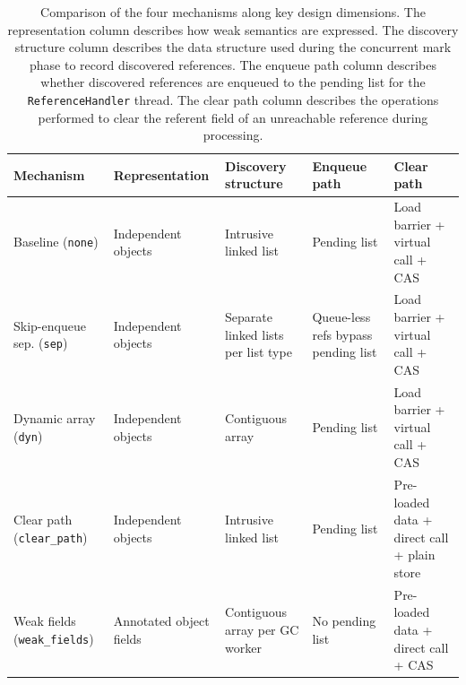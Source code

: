 \begin{table}[t]
\centering
\caption[Summary comparison of the four mechanisms]{Comparison of the four mechanisms along key design dimensions. The representation column describes how weak semantics are expressed. The discovery structure column describes the data structure used during the concurrent mark phase to record discovered references. The enqueue path column describes whether discovered references are enqueued to the pending list for the \texttt{ReferenceHandler} thread. The clear path column describes the operations performed to clear the referent field of an unreachable reference during processing.}
\label{tab:mechanism-summary}
\small
\begin{tabularx}{\textwidth}{@{}>{\hsize=1.0\hsize\raggedright\arraybackslash}X
                              >{\hsize=1.0\hsize\raggedright\arraybackslash}X
                              >{\hsize=1.0\hsize\raggedright\arraybackslash}X
                              >{\hsize=1.0\hsize\raggedright\arraybackslash}X
                              >{\hsize=1.0\hsize\raggedright\arraybackslash}X@{}}
\toprule
\textbf{Mechanism} & \textbf{Representation} & \textbf{Discovery structure} & \textbf{Enqueue path} & \textbf{Clear path} \\
\midrule
Baseline (\texttt{none})
  & Independent objects
  & Intrusive linked list
  & Pending list
  & Load barrier + virtual call + \ac{CAS} \\
\addlinespace
Skip-enqueue sep. (\texttt{sep})
  & Independent objects
  & Separate linked lists per list type
  & Queue-less refs bypass pending list
  & Load barrier + virtual call + \ac{CAS} \\
\addlinespace
Dynamic array (\texttt{dyn})
  & Independent objects
  & Contiguous array
  & Pending list
  & Load barrier + virtual call + \ac{CAS} \\
\addlinespace
Clear path (\texttt{clear\_path})
  & Independent objects
  & Intrusive linked list
  & Pending list
  & Pre-loaded data + direct call + plain store \\
\addlinespace
Weak fields (\texttt{weak\_fields})
  & Annotated object fields
  & Contiguous array per \ac{GC} worker
  & No pending list
  & Pre-loaded data + direct call + \ac{CAS}\\
\bottomrule
\end{tabularx}
\normalsize
\end{table}

